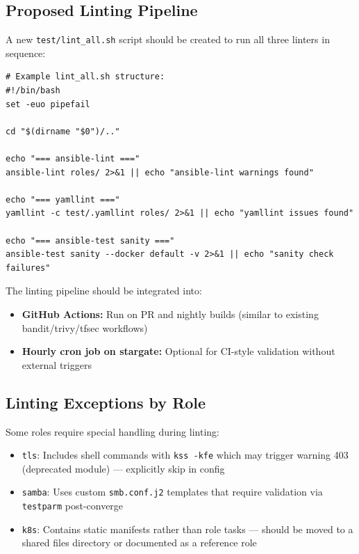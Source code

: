\subsection{Proposed Linting Pipeline}

A new \texttt{test/lint\_all.sh} script should be created to run all three linters in sequence:

\begin{verbatim}
# Example lint_all.sh structure:
#!/bin/bash
set -euo pipefail

cd "$(dirname "$0")/.."

echo "=== ansible-lint ==="
ansible-lint roles/ 2>&1 || echo "ansible-lint warnings found"

echo "=== yamllint ==="
yamllint -c test/.yamllint roles/ 2>&1 || echo "yamllint issues found"

echo "=== ansible-test sanity ==="
ansible-test sanity --docker default -v 2>&1 || echo "sanity check failures"
\end{verbatim}

The linting pipeline should be integrated into:
\begin{itemize}
    \item \textbf{GitHub Actions:} Run on PR and nightly builds (similar to existing bandit/trivy/tfsec workflows)
    \item \textbf{Hourly cron job on stargate:} Optional for CI-style validation without external triggers
\end{itemize}

\subsection{Linting Exceptions by Role}

Some roles require special handling during linting:
\begin{itemize}
    \item \texttt{tls}: Includes shell commands with \texttt{kss -kfe} which may trigger warning 403 (deprecated module) — explicitly skip in config
    \item \texttt{samba}: Uses custom \texttt{smb.conf.j2} templates that require validation via \texttt{testparm} post-converge
    \item \texttt{k8s}: Contains static manifests rather than role tasks — should be moved to a shared files directory or documented as a reference role
\end{itemize}
